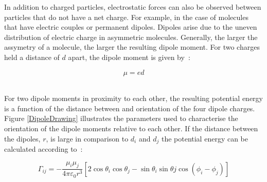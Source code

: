 In addition to charged particles, electrostatic forces can also be observed between particles that do not have a net charge. For example, in the case of molecules that have electric couples or permanent dipoles. Dipoles arise due to the uneven distribution of electric charge in asymmetric molecules. Generally, the larger the assymetry of a molecule, the larger the resulting dipole moment. For two charges held a distance of $d$ apart, the dipole moment is given by~\cite{MolecularThermodynamicsOfFluidPhaseEquilibria}:\

\begin{equation}
\mu = \mathit{e} d \label{DipoleMoment}
\end{equation}\


For two dipole moments in proximity to each other, the resulting potential energy is a function of the distance between and orientation of the four dipole charges. Figure \ref{DipoleDrawing} illustrates the parameters used to characterise the orientation of the dipole moments relative to each other. If the distance between the dipoles, $r$, is large in comparison to $d_{i}$ and $d_{j}$ the potential energy can be calculated according to~\cite{MolecularThermodynamicsOfFluidPhaseEquilibria}:\

\begin{equation}
\Gamma_{ij} = -\frac{\mu_{i}\mu_{j}}{4 \pi \varepsilon_{0} r^{3}}\left[2 \cos\theta_{i}\cos\theta_{j} - \sin\theta_{i}\sin\theta{j}\cos\left(\phi_{i}-\phi_{j}\right)\right] \label{Dipole Potential}
\end{equation}\


